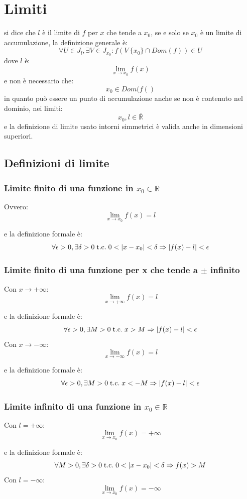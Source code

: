 \documentclass[a4paper, 12pt, openany]{book}
\begin{document}
	 \chapter{Limiti}
	 si dice che $l$ è il limite di $f$ per $x$ che tende a $x_0$, se e solo se $x_0$ è un limite di accumulazione, la definizione generale è:
	 \[\forall U \in J_l, \exists V \in J_{x_0} : f(V\ \{x_0\}\cap Dom(f)) \in U\]
	 dove $l$ è:
	 \[\lim_{x \rightarrow x_0} f(x)\]
	 e non è necessario che:
	 \[x_0 \in Dom(f()\]
	 in quanto può essere un punto di accumulazione anche se non è contenuto nel dominio, nei limiti:
	 \[x_0, l \in \overline{\mathbb{R}}\]
	 e la definizione di limite usato intorni simmetrici è valida anche in dimensioni superiori.
	 \section{Definizioni di limite}
	 \subsection{Limite finito di una funzione in $x_0 \in \mathbb{R}$}
	 Ovvero:
	 \[\lim_{x \rightarrow x_0} f(x) = l\]
	 
	 e la definizione formale è:
	 \[\forall \epsilon > 0, \exists \delta > 0 \;\text{t.c.}\; 0 < |x - x_0| < \delta \Rightarrow |f(x) - l| < \epsilon\]
	 \subsection{Limite finito di una funzione per x che tende a $\pm$ infinito}
	 Con $x \rightarrow + \infty$:
	 \[\lim_{x \rightarrow + \infty} f(x) = l\]
	 
	 e la definizione formale è:
	 \[\forall \epsilon > 0, \exists M > 0 \;\text{t.c.}\; x > M \Rightarrow |f(x) - l| < \epsilon\]
	 Con $x \rightarrow - \infty$:
	 \[\lim_{x \rightarrow - \infty} f(x) = l\]
	 
	 e la definizione formale è:
	 \[\forall \epsilon > 0, \exists M > 0 \;\text{t.c.}\; x < -M \Rightarrow |f(x) - l| < \epsilon\]
	 \subsection{Limite infinito di una funzione in $x_0 \in \mathbb{R}$}
	 Con $l = +\infty$:
	 \[\lim_{x \rightarrow x_0} f(x) = + \infty\]
	 
	 e la definizione formale è:
	 \[\forall M > 0, \exists \delta > 0 \;\text{t.c.}\; 0 < |x - x_0| < \delta \Rightarrow f(x) > M\]
	 Con $l = -\infty$:
	 \[\lim_{x \rightarrow x_0} f(x) = - \infty\]
	 
\end{document}
